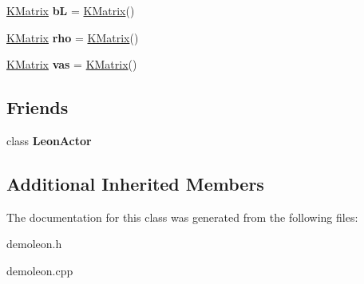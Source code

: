 \begin{DoxyCompactItemize}
\item 
\hypertarget{class_demo_leon_1_1_leon_model_a079da964cfd291c6379a3f8f3b4eb007}{\hyperlink{class_k_base_1_1_k_matrix}{K\-Matrix} {\bfseries b\-L} = \hyperlink{class_k_base_1_1_k_matrix}{K\-Matrix}()}\label{class_demo_leon_1_1_leon_model_a079da964cfd291c6379a3f8f3b4eb007}

\item 
\hypertarget{class_demo_leon_1_1_leon_model_a65f640d25245c6f6b70c63bf5770a95c}{\hyperlink{class_k_base_1_1_k_matrix}{K\-Matrix} {\bfseries rho} = \hyperlink{class_k_base_1_1_k_matrix}{K\-Matrix}()}\label{class_demo_leon_1_1_leon_model_a65f640d25245c6f6b70c63bf5770a95c}

\item 
\hypertarget{class_demo_leon_1_1_leon_model_acc79412a1612323750d7f09064f46db2}{\hyperlink{class_k_base_1_1_k_matrix}{K\-Matrix} {\bfseries vas} = \hyperlink{class_k_base_1_1_k_matrix}{K\-Matrix}()}\label{class_demo_leon_1_1_leon_model_acc79412a1612323750d7f09064f46db2}

\end{DoxyCompactItemize}
\subsection*{Friends}
\begin{DoxyCompactItemize}
\item 
\hypertarget{class_demo_leon_1_1_leon_model_a5cf4577c974c9fdb3f8af300f80e7c8e}{class {\bfseries Leon\-Actor}}\label{class_demo_leon_1_1_leon_model_a5cf4577c974c9fdb3f8af300f80e7c8e}

\end{DoxyCompactItemize}
\subsection*{Additional Inherited Members}


The documentation for this class was generated from the following files\-:\begin{DoxyCompactItemize}
\item 
demoleon.\-h\item 
demoleon.\-cpp\end{DoxyCompactItemize}
